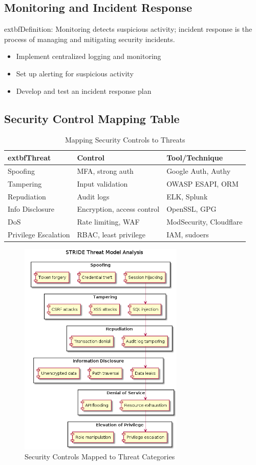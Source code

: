 \subsection*{Monitoring and Incident Response}
	extbf{Definition:} Monitoring detects suspicious activity; incident response is the process of managing and mitigating security incidents.\cite{uceda2015}
\begin{itemize}
	\item Implement centralized logging and monitoring
	\item Set up alerting for suspicious activity
	\item Develop and test an incident response plan
\end{itemize}

\subsection*{Security Control Mapping Table}
\begin{table}[H]
\centering
\begin{tabular}{|l|l|l|}
\hline
	extbf{Threat} & \textbf{Control} & \textbf{Tool/Technique} \\
\hline
Spoofing & MFA, strong auth & Google Auth, Authy \\
Tampering & Input validation & OWASP ESAPI, ORM \\
Repudiation & Audit logs & ELK, Splunk \\
Info Disclosure & Encryption, access control & OpenSSL, GPG \\
DoS & Rate limiting, WAF & ModSecurity, Cloudflare \\
Privilege Escalation & RBAC, least privilege & IAM, sudoers \\
\hline
\end{tabular}
\caption{Mapping Security Controls to Threats\cite{owasp,shostack2014}}
\end{table}

\begin{figure}[H]
	\centering
	\includegraphics[width=0.7\textwidth]{images/stride-analysis}
	\caption{Security Controls Mapped to Threat Categories}
\end{figure}
